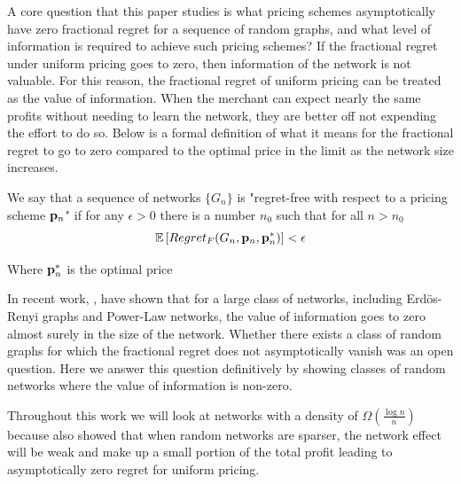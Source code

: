 A core question that this paper studies is what pricing schemes asymptotically have zero fractional regret for a sequence of random graphs, and what level of information is required to achieve such pricing schemes? If the fractional regret under uniform pricing goes to zero, then information of the network is not valuable. For this reason, the fractional regret of uniform pricing can be treated as the value of information. When the merchant can expect nearly the same profits without needing to learn the network, they are better off not expending the effort to do so. Below is a formal definition of what it means for the fractional regret to go to zero compared to the optimal price in the limit as the network size increases.


\begin{definition}
    We say that a sequence of networks $\{G_n\}$ is "regret-free with respect to a pricing scheme $\mathbf{p}_n$"  if for any $\epsilon > 0$ there is a number $n_0$ such that for all $n > n_0$
    \begin{equation*}
        \mathbb{E}\left[ Regret_F(G_n, \mathbf{p}_n, \mathbf{p}_n^*) \right] < \epsilon
    \end{equation*}

    Where $\mathbf{p}_n^*$ is the optimal price
\end{definition}

In recent work, \cite{huang2022value}, have shown that for a large class of networks, including Erd\"{o}s-Renyi graphs and Power-Law networks, the value of information goes to zero almost surely in the size of the network. Whether there exists a class of random graphs for which the fractional regret does not asymptotically vanish was an open question. Here we answer this question definitively by showing classes of random networks where the value of information is non-zero. 

Throughout this work we will look at networks with a density of $\Omega( \frac{\log n}{n})$ because \cite{huang2022value} also showed that when random networks are sparser, the network effect will be weak and make up a small portion of the total profit leading to asymptotically zero regret for uniform pricing.


